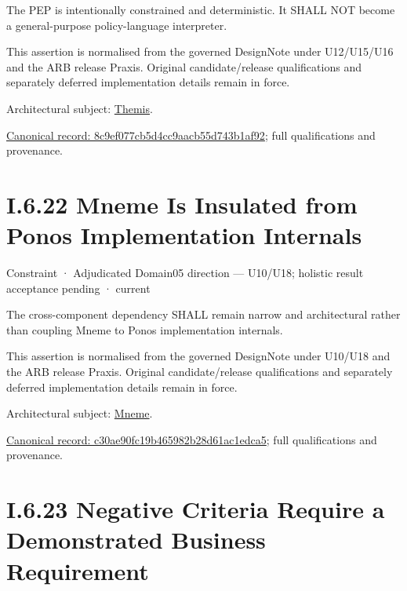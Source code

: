 The PEP is intentionally constrained and deterministic. It SHALL NOT become a general-purpose policy-language interpreter.



This assertion is normalised from the governed DesignNote under U12/U15/U16 and the ARB release Praxis. Original candidate/release qualifications and separately deferred implementation details remain in force.



Architectural subject: \hyperref[element:899d34ec491948b68aad09e507dea6d1]{Themis}.


{\footnotesize \href{../../../../../../../continuum/motivation/constraint/8c9ef077cb5d4cc9aacb55d743b1af92.md}{Canonical record: 8c9ef077cb5d4cc9aacb55d743b1af92}; full qualifications and provenance.}\par
\section*{I.6.22 Mneme Is Insulated from Ponos Implementation Internals}
\label{navigation:I.6.22}

\label{element:c30ae90fc19b465982b28d61ac1edca5}
{\small Constraint · Adjudicated Domain05 direction — U10/U18; holistic result acceptance pending · current}\par

The cross-component dependency SHALL remain narrow and architectural rather than coupling Mneme to Ponos implementation internals.



This assertion is normalised from the governed DesignNote under U10/U18 and the ARB release Praxis. Original candidate/release qualifications and separately deferred implementation details remain in force.



Architectural subject: \hyperref[element:1af8a56358f7429fabfb57be66542a99]{Mneme}.


{\footnotesize \href{../../../../../../../continuum/motivation/constraint/c30ae90fc19b465982b28d61ac1edca5.md}{Canonical record: c30ae90fc19b465982b28d61ac1edca5}; full qualifications and provenance.}\par
\section*{I.6.23 Negative Criteria Require a Demonstrated Business Requirement}
\label{navigation:I.6.23}

